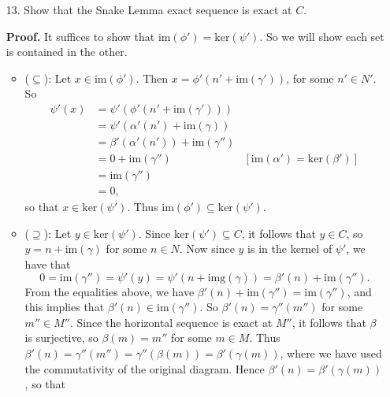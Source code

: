 \documentclass[9pt]{article}
\begin{document}
\begin{enumerate}
   \item[13.]  Show that the Snake Lemma exact sequence is exact at $C$.

      \textbf{Proof.} It suffices to show that
      $\text{im}(\phi') = \text{ker}(\psi')$. So we will show each set is
      contained in the other.
      \begin{itemize}
         \item ($\subseteq$): Let $x \in \text{im}(\phi')$. Then
               $x = \phi'(n' + \text{im}(\gamma'))$, for some $n' \in N'$. So
               \begin{align*}
                  \psi'(x) &= \psi'(\phi'(n' + \text{im}(\gamma'))) \\
                     &= \psi'(\alpha'(n') + \text{im}(\gamma)) \\
                     &= \beta'(\alpha'(n')) + \text{im}(\gamma'') \\
                     &= 0 + \text{im}(\gamma'')
                        &[\text{im}(\alpha') = \text{ker}(\beta')] \\
                     &= \text{im}(\gamma'') \\
                     &= 0,
               \end{align*}
               so that $x \in \text{ker}(\psi')$. Thus 
               $\text{im}(\phi') \subseteq \text{ker}(\psi')$.
         \item ($\supseteq$): Let $y \in \text{ker}(\psi')$. Since
               $\text{ker}(\psi') \subseteq C$, it follows that $y \in C$, so
               $y = n + \text{im}(\gamma)$ for some $n \in N$. Now since $y$ is
               in the kernel of $\psi'$, we have that
               $$0 = \text{im}(\gamma'') = \psi'(y) =
                 \psi'(n + \text{img}(\gamma)) =
                 \beta'(n) + \text{im}(\gamma'').$$
               From the equalities above, we have
               $\beta'(n) + \text{im}(\gamma'') = \text{im}(\gamma'')$, and this
               implies that $\beta'(n) \in \text{im}(\gamma'')$. So
               $\beta'(n) = \gamma''(m'')$ for some $m'' \in M''$. Since the
               horizontal sequence is exact at $M''$, it follows that $\beta$ is
               surjective, so $\beta(m) = m''$ for some $m \in M$. Thus
               $\beta'(n) = \gamma''(m'') = \gamma''(\beta(m)) =
                \beta'(\gamma(m))$, where we have used the commutativity of the
               original diagram. Hence $\beta'(n) = \beta'(\gamma(m))$, so that

\end{itemize}
\end{enumerate}
\end{document}
